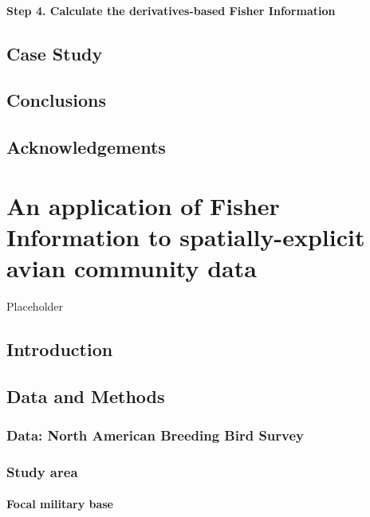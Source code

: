 \documentclass[12pt,twoside,openany]{reedthesis}
\begin{document}
\subsubsection{\texorpdfstring{\textbf{Step 4.} Calculate the
derivatives-based Fisher
Information}{Step 4. Calculate the derivatives-based Fisher Information}}\label{step-4.-calculate-the-derivatives-based-fisher-information}

\section{Case Study}\label{case-study}

\section{Conclusions}\label{conclusions}

\section{Acknowledgements}\label{acknowledgements}

\chapter{An application of Fisher Information to spatially-explicit
avian community data}\label{fisherSpatial}

Placeholder

\section{Introduction}\label{introduction-2}

\section{Data and Methods}\label{data-and-methods}

\subsection{Data: North American Breeding Bird
Survey}\label{data-north-american-breeding-bird-survey}

\subsection{Study area}\label{study-area}

\subsubsection{Focal military base}\label{focal-military-base}
\end{document}
